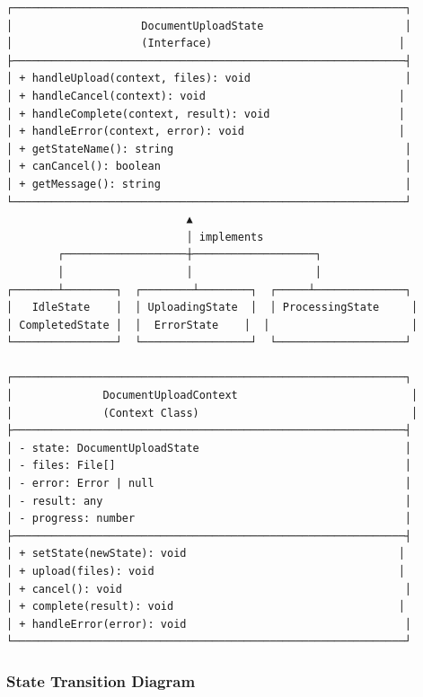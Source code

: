 \documentclass[11pt,a4paper]{article}
\begin{document}
\begin{verbatim}
┌─────────────────────────────────────────────────────────────┐
│                    DocumentUploadState                      │
│                    (Interface)                             │
├─────────────────────────────────────────────────────────────┤
│ + handleUpload(context, files): void                        │
│ + handleCancel(context): void                              │
│ + handleComplete(context, result): void                    │
│ + handleError(context, error): void                        │
│ + getStateName(): string                                    │
│ + canCancel(): boolean                                      │
│ + getMessage(): string                                      │
└─────────────────────────────────────────────────────────────┘
                            ▲
                            │ implements
        ┌───────────────────┼───────────────────┐
        │                   │                   │
┌───────┴────────┐  ┌────────┴────────┐  ┌─────┴──────────────┐
│   IdleState    │  │ UploadingState  │  │ ProcessingState     │
│ CompletedState │  │  ErrorState    │  │                      │
└────────────────┘  └─────────────────┘  └────────────────────┘

┌─────────────────────────────────────────────────────────────┐
│              DocumentUploadContext                           │
│              (Context Class)                                 │
├─────────────────────────────────────────────────────────────┤
│ - state: DocumentUploadState                                │
│ - files: File[]                                             │
│ - error: Error | null                                       │
│ - result: any                                               │
│ - progress: number                                          │
├─────────────────────────────────────────────────────────────┤
│ + setState(newState): void                                 │
│ + upload(files): void                                      │
│ + cancel(): void                                            │
│ + complete(result): void                                   │
│ + handleError(error): void                                  │
└─────────────────────────────────────────────────────────────┘
\end{verbatim}

\subsubsection{State Transition Diagram}
\end{document}
